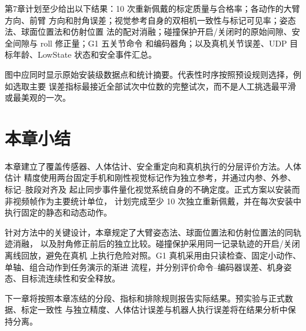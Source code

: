 第7章计划至少给出以下结果：10 次重新佩戴的标定质量与合格率；各动作的大臂方向、前臂
方向和肘角误差；视觉参考自身的双相机一致性与标记可见率；姿态法、球面位置法和仿射位置
法的配对消融；碰撞保护开启/关闭时的原始间隙、安全间隙与 roll 修正量；G1 五关节命令
和编码器角；以及真机关节误差、UDP 目标年龄、LowState 状态和安全事件汇总。

图中应同时显示原始安装级数据点和统计摘要。代表性时序按照预设规则选择，例如选取主要
误差指标最接近全部试次中位数的完整试次，而不是人工挑选最平滑或最美观的一次。

\section{本章小结}
\label{sec:ch6_summary}

本章建立了覆盖传感器、人体估计、安全重定向和真机执行的分层评价方法。人体估计
精度使用两台固定手机和刚性视觉标记作为独立参考，并通过内参、外参、标记--肢段对齐及
起止同步事件量化视觉系统自身的不确定度。正式方案以安装而非视频帧作为主要统计单位，
计划完成至少 10 次独立重新佩戴，并在每次安装中执行固定的静态和动态动作。

针对方法中的关键设计，本章规定了大臂姿态法、球面位置法和仿射位置法的同轨迹消融，
以及肘角修正前后的独立比较。碰撞保护采用同一记录轨迹的开启/关闭离线回放，避免在真机
上执行危险对照。G1 真机采用由只读检查、固定小动作、单轴、组合动作到任务演示的渐进
流程，并分别评价命令--编码器误差、机身姿态、目标流连续性和安全释放。

下一章将按照本章冻结的分段、指标和排除规则报告实际结果。预实验与正式数据、标定一致性
与独立精度、人体估计误差与机器人执行误差将在结果分析中保持分离。

